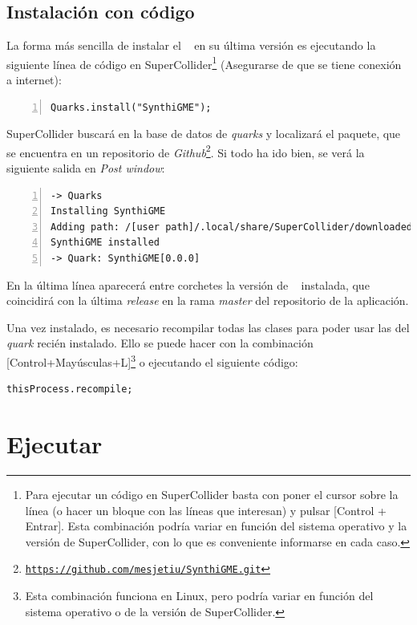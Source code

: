 \subsection{Instalación con código}

La forma más sencilla de instalar el \appName~ en su última versión es ejecutando la siguiente línea de código en SuperCollider\footnote{Para ejecutar un código en SuperCollider basta con poner el cursor sobre la línea (o hacer un bloque con las líneas que interesan) y pulsar [Control + Entrar]. Esta combinación podría variar en función del sistema operativo y la versión de SuperCollider, con lo que es conveniente informarse en cada caso.} (Asegurarse de que se tiene conexión a internet):

\begin{lstlisting}[style=SuperCollider-IDE, frame=single, numbers=left]
Quarks.install("SynthiGME");
\end{lstlisting}

SuperCollider buscará en la base de datos de \textit{quarks} y localizará el paquete, que se encuentra en un repositorio de \textit{Github}\footnote{\href{https://github.com/mesjetiu/SynthiGME.git}{\texttt{https://github.com/mesjetiu/SynthiGME.git}}}. Si todo ha ido bien, se verá la siguiente salida en \textit{Post window}:

\begin{lstlisting}[frame=single, numbers=left]
-> Quarks
Installing SynthiGME
Adding path: /[user path]/.local/share/SuperCollider/downloaded-quarks/SynthiGME
SynthiGME installed
-> Quark: SynthiGME[0.0.0]
\end{lstlisting}

En la última línea aparecerá entre corchetes la versión de \appName~ instalada, que coincidirá con la última \textit{release} en la rama \textit{master} del repositorio de la aplicación.

Una vez instalado, es necesario recompilar todas las clases para poder usar las del \textit{quark} recién instalado. Ello se puede hacer con la combinación [Control+Mayúsculas+L]\footnote{Esta combinación funciona en Linux, pero podría variar en función del sistema operativo o de la versión de SuperCollider.} o ejecutando el siguiente código:

\begin{lstlisting}[style=SuperCollider-IDE, frame=single]
thisProcess.recompile;
\end{lstlisting}


\section{Ejecutar \appName}
\label{ejecucion}

